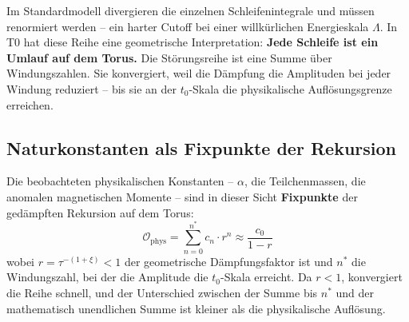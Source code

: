 	Im Standardmodell divergieren die einzelnen Schleifenintegrale und müssen renormiert werden -- ein harter Cutoff bei einer willkürlichen Energieskala $\Lambda$. In T0 hat diese Reihe eine geometrische Interpretation: \textbf{Jede Schleife ist ein Umlauf auf dem Torus.} Die Störungsreihe ist eine Summe über Windungszahlen. Sie konvergiert, weil die Dämpfung die Amplituden bei jeder Windung reduziert -- bis sie an der $t_0$-Skala die physikalische Auflösungsgrenze erreichen.
	
	\begin{table}[h]
		\centering
		\caption{Schleifendiagramme im SM vs.\ Windungen in T0}
		\label{tab:schleifen}
	\end{table}
	
	\subsection{Naturkonstanten als Fixpunkte der Rekursion}
	
	Die beobachteten physikalischen Konstanten -- $\alpha$, die Teilchenmassen, die anomalen magnetischen Momente -- sind in dieser Sicht \textbf{Fixpunkte} der gedämpften Rekursion auf dem Torus:
	\begin{equation}
		\mathcal{O}_\text{phys} = \sum_{n=0}^{n^*} c_n \cdot r^n \approx \frac{c_0}{1 - r}
	\end{equation}
	wobei $r = \tau^{-(1+\xi)} < 1$ der geometrische Dämpfungsfaktor ist und $n^*$ die Windungszahl, bei der die Amplitude die $t_0$-Skala erreicht. Da $r < 1$, konvergiert die Reihe schnell, und der Unterschied zwischen der Summe bis $n^*$ und der mathematisch unendlichen Summe ist kleiner als die physikalische Auflösung.
	
